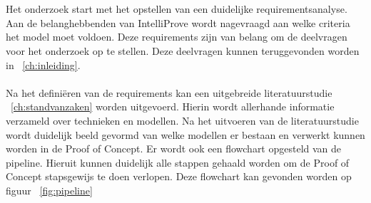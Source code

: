 
\chapter{}%
\label{ch:methodologie}

Het onderzoek start met het opstellen van een duidelijke requirementsanalyse. Aan de belanghebbenden van IntelliProve wordt nagevraagd aan welke criteria het model moet voldoen. Deze requirements zijn van belang om de deelvragen voor het onderzoek op te stellen. Deze deelvragen kunnen teruggevonden worden in {~\ref{ch:inleiding}}. \\
\\
Na het definiëren van de requirements kan een uitgebreide literatuurstudie {~\ref{ch:standvanzaken}} worden uitgevoerd. Hierin wordt allerhande informatie verzameld over technieken en modellen. Na het uitvoeren van de literatuurstudie wordt duidelijk beeld gevormd van welke modellen er bestaan en verwerkt kunnen worden in de Proof of Concept. Er wordt ook een flowchart opgesteld van de pipeline. Hieruit kunnen duidelijk alle stappen gehaald worden om de Proof of Concept stapsgewijs te doen verlopen. Deze flowchart kan gevonden worden op figuur {~\ref{fig:pipeline}}\\
\\ 
